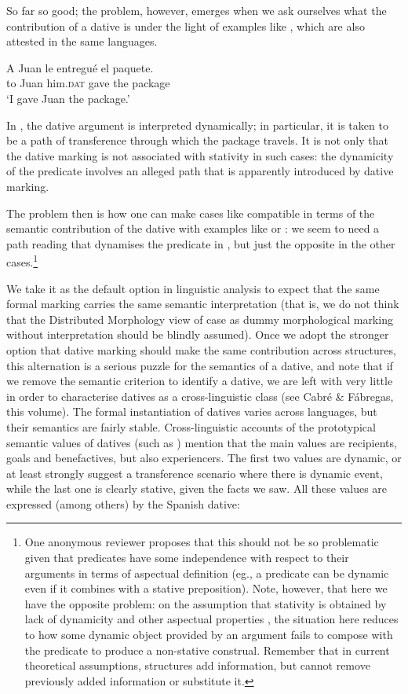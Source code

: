 \documentclass[output=paper,colorlinks,citecolor=brown,nonflat]{./langscibook}
\begin{document}
So far so good; the problem, however, emerges when we ask ourselves what the contribution of a dative is under the light of examples like , which are also attested in the same languages. 

\ea%
    \label{ex:fabregas:9}
    \gll    A Juan le       entregué el  paquete.\\
            {to} {Juan} {him.}\textsc{dat}   {gave}    {the} {package}\\
    \glt `I gave Juan the package.'
    \z

In , the dative argument is interpreted dynamically; in particular, it is taken to be a path of transference through which the package travels. It is not only that the dative marking is not associated with stativity in such cases: the dynamicity of the predicate involves an alleged path that is apparently introduced by dative marking.

The problem then is how one can make cases like  compatible in terms of the semantic contribution of the dative with examples like  or : we seem to need a path reading that dynamises the predicate in , but just the opposite in the other cases.\footnote{One anonymous reviewer proposes that this should not be so problematic given that predicates have some independence with respect to their arguments in terms of aspectual definition (eg., a predicate can be dynamic even if it combines with a stative preposition). Note, however, that here we have the opposite problem: on the assumption that stativity is obtained by lack of dynamicity and other aspectual properties \citet{JaqueHidalgo2014}, the situation here reduces to how some dynamic object provided by an argument fails to compose with the predicate to produce a non-stative construal. Remember that in current theoretical assumptions, structures add information, but cannot remove previously added information or substitute it.} 

We take it as the default option in linguistic analysis to expect that the same formal marking carries the same semantic interpretation (that is, we do not think that the Distributed Morphology view of case as dummy morphological marking without interpretation should be blindly assumed). Once we adopt the stronger option that dative marking should make the same contribution across structures, this alternation is a serious puzzle for the semantics of a dative, and note that if we remove the semantic criterion to identify a dative, we are left with very little in order to characterise datives as a cross-linguistic class (see Cabré \& Fábregas, this volume). The formal instantiation of datives varies across languages, but their semantics are fairly stable. Cross-linguistic accounts of the prototypical semantic values of datives (such as \citealt{Næss2009}) mention that the main values are recipients, goals and benefactives, but also experiencers. The first two values are dynamic, or at least strongly suggest a transference scenario where there is dynamic event, while the last one is clearly stative, given the facts we saw. All these values are expressed (among others) by the Spanish dative:
\end{document}
